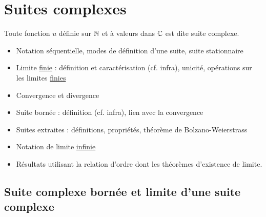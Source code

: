 \section{Suites complexes}
\begin{defi}
    Toute fonction \(u\) définie sur \(\mathbb{N}\) et à valeurs dans \(\mathbb{C}\) est dite suite complexe.
\end{defi}

\begin{defprop}
    \begin{itemize}
        \item Notation séquentielle, modes de définition d’une suite, suite stationnaire
        \item Limite \underline{finie} : définition et caractérisation (cf. infra), unicité, opérations sur les limites \underline{finies}
        \item Convergence et divergence
        \item Suite bornée : définition (cf. infra), lien avec la convergence
        \item Suites extraites : définitions, propriétés, théorème de Bolzano-Weierstrass
    \end{itemize}
\end{defprop}

\begin{defprop}
    \begin{itemize}
        \item Notation de limite \underline{infinie}
        \item Résultats utilisant la relation d’ordre dont les théorèmes d’existence de limite.
    \end{itemize}
\end{defprop}

\subsection{Suite complexe bornée et limite d’une suite complexe}

